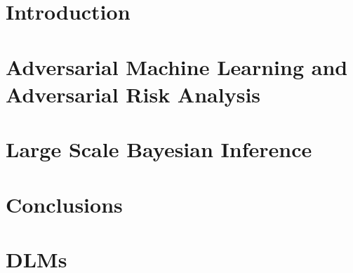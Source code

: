 \documentclass[a4paper, 11pt, openright, twoside]{reportPhD}
\numberwithin{equation}{section}
\numberwithin{figure}{chapter}
\numberwithin{table}{chapter}
\begin{document}
\chapter{Introduction}\label{cha:intro}

\setcounter{page}{1}



\chapter{Adversarial Machine Learning and Adversarial Risk Analysis}\label{cha:amlara}
%


\chapter{Large Scale Bayesian Inference}\label{cha:bayes}



%


%

\chapter{Conclusions}\label{cha:conclusions}





\iffalse


\chapter{DLMs}\label{cha:dlm}


\iffalse
Link to parallel scan implementation in Jax: \url{https://colab.research.google.com/drive/1Ni8Cf1Pw-F2gtO-r21ifnQ9QJUZ2qm3T?usp=sharing}

Check this \url{https://en.wikipedia.org/wiki/Kalman_filter#Marginal_likelihood} for marginalizing out the latent variables an then use SGD for MAP of the variances, or as in VIS.
\fi
\end{document}
